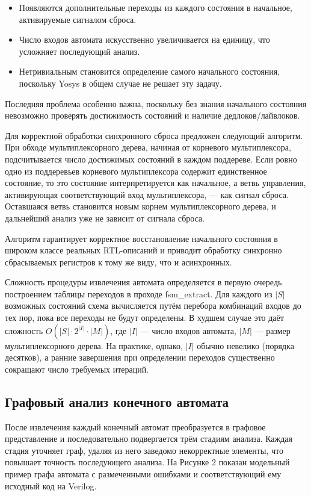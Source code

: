 \begin{itemize}
\item Появляются дополнительные переходы из каждого состояния в начальное, активируемые
сигналом сброса.

\item Число входов автомата искусственно увеличивается на единицу, что усложняет последующий анализ.

\item Нетривиальным становится определение самого начального состояния, поскольку Yosys в
общем случае не решает эту задачу.
\end{itemize}

Последняя проблема особенно важна, поскольку без знания начального состояния невозможно проверять
достижимость состояний и наличие дедлоков/лайвлоков.

Для корректной обработки синхронного сброса предложен следующий алгоритм. При обходе
мультиплексорного дерева, начиная от корневого мультиплексора, подсчитывается число достижимых
состояний в каждом поддереве. Если ровно одно из поддеревьев корневого мультиплексора содержит
единственное состояние, то это состояние
интерпретируется как начальное, а ветвь управления, активирующая соответствующий вход
мультиплексора, --- как сигнал сброса. Оставшаяся ветвь становится новым корнем мультиплексорного
дерева, и дальнейший анализ уже не зависит от сигнала сброса.

Алгоритм гарантирует корректное восстановление начального состояния в широком классе реальных
RTL-описаний и приводит обработку синхронно сбрасываемых регистров к тому же виду,
что и асинхронных.

Сложность процедуры извлечения автомата определяется в первую очередь построением таблицы переходов
в проходе fsm\_extract. Для каждого из $|S|$ возможных состояний схема вычисляется путём перебора
комбинаций входов до тех пор, пока все переходы не будут определены. В худшем случае это даёт
сложность $O(|S|\cdot 2^{|I|}\cdot|M|)$, где $|I|$ — число входов автомата, $|M|$ — размер
мультиплексорного дерева. На практике, однако, $|I|$ обычно невелико (порядка десятков), а ранние
завершения при определении переходов существенно сокращают число требуемых итераций.

\subsection{Графовый анализ конечного автомата}

После извлечения каждый конечный автомат преобразуется в графовое представление и
последовательно подвергается трём стадиям анализа. Каждая стадия уточняет граф, удаляя
из него заведомо некорректные элементы, что повышает точность последующего анализа.
На Рисунке 2 показан модельный пример графа автомата с размеченными ошибками и
соответствующий ему исходный код на Verilog.

